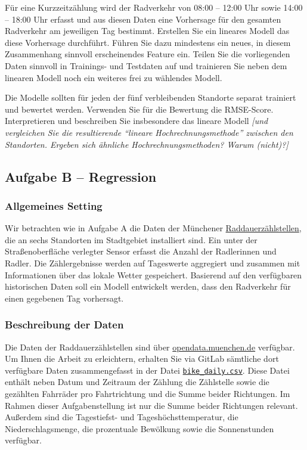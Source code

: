 \documentclass[11pt,a4paper]{article}
\begin{document}
Für eine Kurzzeitzählung wird der Radverkehr von 08:00 -- 12:00 Uhr sowie 14:00 -- 18:00 Uhr erfasst und aus diesen Daten eine Vorhersage für den gesamten Radverkehr am jeweiligen Tag bestimmt. Erstellen Sie ein lineares Modell das diese Vorhersage durchführt. Führen Sie dazu mindestens ein neues, in diesem Zusammenhang sinnvoll erscheinendes Feature ein. Teilen Sie die vorliegenden Daten sinnvoll in Trainings- und Testdaten auf und trainieren Sie neben dem linearen Modell noch ein weiteres frei zu wählendes Modell.

Die Modelle sollten für jeden der fünf verbleibenden Standorte separat trainiert und bewertet werden. Verwenden Sie für die Bewertung die RMSE-Score. Interpretieren und beschreiben Sie insbesondere das lineare Modell \emph{[und vergleichen Sie die resultierende ``lineare Hochrechnungsmethode'' zwischen den Standorten. Ergeben sich ähnliche Hochrechnungsmethoden? Warum (nicht)?]}

\newpage
\subsection*{Aufgabe B -- Regression}
\subsubsection*{Allgemeines Setting}
Wir betrachten wie in Aufgabe A die Daten der Münchener \href{https://opendata.muenchen.de/pages/raddauerzaehlstellen}{Raddauerzählstellen}, die an sechs Standorten im Stadtgebiet installiert sind. Ein unter der Straßenoberfläche verlegter Sensor erfasst die Anzahl der Radlerinnen und Radler. Die Zählergebnisse werden auf Tageswerte aggregiert und zusammen mit Informationen über das lokale Wetter gespeichert. Basierend auf den verfügbaren historischen Daten soll ein Modell entwickelt werden, dass den Radverkehr für einen gegebenen Tag vorhersagt.

\subsubsection*{Beschreibung der Daten}
Die Daten der Raddauerzählstellen sind über \href{https://opendata.muenchen.de/dataset?tags=Raddauerz%C3%A4hlstellen}{opendata.muenchen.de} verfügbar. Um Ihnen die Arbeit zu erleichtern, erhalten Sie via GitLab sämtliche dort verfügbare Daten zusammengefasst in der Datei \href{https://gitlab.lrz.de/christian-moeller/machine-learning/-/raw/main/Studienarbeit/data/bike_daily.csv}{\texttt{bike\_daily.csv}}. 
Diese Datei enthält neben Datum und Zeitraum der Zählung die Zählstelle sowie die gezählten Fahrräder pro Fahrtrichtung und die Summe beider Richtungen. Im Rahmen dieser Aufgabenstellung ist nur die Summe beider Richtungen relevant. Außerdem sind die Tagestiefst- und Tageshöchsttemperatur, die Niederschlagsmenge, die prozentuale Bewölkung sowie die Sonnenstunden verfügbar.
\end{document}
